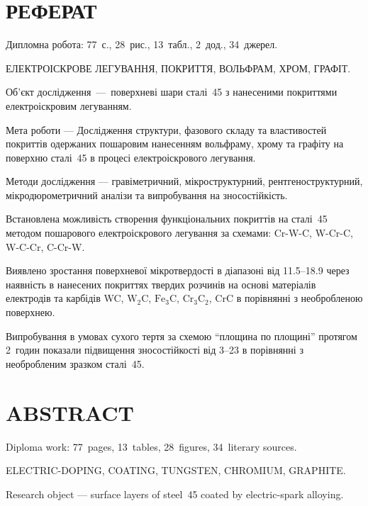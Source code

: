 \documentclass[a4paper,fontsize=14bp,ukrainian]{extreport}
\begin{document}




\setcounter{page}{4}

\chapter*{РЕФЕРАТ}
\thispagestyle{empty}
Дипломна робота: 77~с., 28~рис., 13~табл., 2~дод., 34~джерел.\vspace{5mm}

ЕЛЕКТРОІСКРОВЕ ЛЕГУВАННЯ, ПОКРИТТЯ, ВОЛЬФРАМ, ХРОМ, ГРАФІТ.\vspace{5mm}

Об'єкт дослідження~---~поверхневі шари сталі~45 з нанесеними покриттями електроіскровим легуванням.

Мета роботи --- Дослідження структури, фазового складу та властивостей покриттів одержаних пошаровим нанесенням вольфраму, хрому та графіту на поверхню сталі~45 в процесі електроіскрового легування.

Методи дослідження --- гравіметричний, мікроструктурний, рентгеноструктурний, мікродюрометричний аналізи та випробування на зносостійкість.

Встановлена можливість створення функціональних покриттів на сталі~45 методом пошарового електроіскрового легування за схемами: Cr-W-C, W-Cr-C, W-C-Cr, C-Cr-W.

Виявлено зростання поверхневої мікротвердості в діапазоні від \SIrange{11.5}{18.9}{\gpa} через наявність в нанесених покриттях твердих розчинів на основі матеріалів електродів та карбідів WC, $\text{W}_2\text{C}$, $\text{Fe}_{3}\text{C}$, $\text{Cr}_{3}\text{C}_{2}$, $\text{CrC}$ в порівнянні з необробленою поверхнею.

Випробування в умовах сухого тертя за схемою ``площина по площині'' протягом 2~годин показали підвищення зносостійкості від \SIrange{3}{23}{\mal} в порівнянні з необробленим зразком сталі~45.

\chapter*{ABSTRACT}
\thispagestyle{empty}
Diploma work:  77~pages,  13~tables,  28~figures,  34~literary sources. \vspace{5mm}

ELECTRIC-DOPING, COATING, TUNGSTEN, CHROMIUM, GRAPHITE. \vspace{5mm}

Research object --- surface layers of steel~45 coated by electric-spark alloying.
\end{document}
